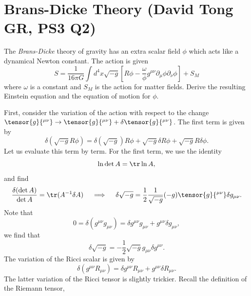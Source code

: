\section{Brans-Dicke Theory (David Tong GR, PS3 Q2)}

The \textit{Brans-Dicke} theory of gravity has an extra scalar field $\phi$ which 
acts like a dynamical Newton constant. The action is given
\begin{equation}
    S = \frac{1}{16\pi G}\int d^4x\sqrt{-g}\left[R\phi - 
    \frac{\omega}{\phi}g^{\mu\nu}\partial_\mu\phi\partial_\nu\phi\right] + S_M
\end{equation}
where $\omega$ is a constant and $S_M$ is the action for matter fields. Derive 
the resulting Einstein equation and the equation of motion for $\phi$.
\begin{solution}
    First, consider the variation of the action with respect to the change $\tensor{g}{^{\mu\nu}} \to \tensor{g}{^{\mu\nu}} + \delta\tensor{g}{^{\mu\nu}}$. The first term is given by
    \begin{equation}
        \delta(\sqrt{-g}R\phi) = \delta(\sqrt{-g})R\phi +\sqrt{-g}\delta R\phi +\sqrt{-g} R\delta\phi.
    \end{equation}
    Let us evaluate this term by term. For the first term, we use the identity 
    \begin{equation}
        \ln \det A = \tr \ln A,
        \label{eq:detA}
    \end{equation}
    and find
    \begin{equation}
        \frac{\delta(\det A)}{\det A} = \tr (A^{-1}\delta A)\quad \implies\quad \delta\sqrt{-g} = \frac{1}{2}\frac{1}{\sqrt{-g}}(-g)\tensor{g}{^{\mu\nu}}\delta g_{\mu\nu}.
    \end{equation}
    Note that
    \begin{equation}
        0=\delta(g^{\mu\nu}g_{\mu\nu}) = \delta g^{\mu\nu}g_{\mu\nu} + g^{\mu\nu}\delta g_{\mu\nu},
    \end{equation}
    we find that
    \begin{equation}
        \delta\sqrt{-g} =  -\frac{1}{2}\sqrt{-g}g_{\mu\nu}\delta g^{\mu\nu}.
    \end{equation}
    The variation of the Ricci scalar is given by
    \begin{equation}
        \delta(g^{\mu\nu}R_{\mu\nu}) = \delta g^{\mu\nu}R_{\mu\nu} + g^{\mu\nu}\delta R_{\mu\nu}.
    \end{equation}
    The latter variation of the Ricci tensor is slightly trickier. Recall the definition of the Riemann tensor,

\end{solution}
